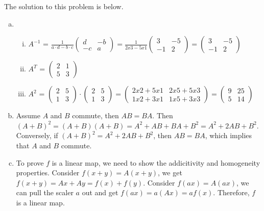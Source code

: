 \documentclass[10pt]{article}
\begin{document}
\begin{solution} 
The solution to this problem is below.
\begin{enumerate}[(a)]
    \item 
    \begin{enumerate}[(i)]
        \item $A^{-1}$ = $\frac{1}{a\cdot d-b\cdot c}\begin{pmatrix}d & -b \\ -c & a\end{pmatrix} = \frac{1}{2x3-5x1}\begin{pmatrix}3 & -5 \\ -1 & 2\end{pmatrix} = \begin{pmatrix}3 & -5 \\ -1 & 2\end{pmatrix}$
        \item $A^T$ = $\begin{pmatrix}2 & 1 \\ 5 & 3\end{pmatrix}$
        \item $A^2$ = $\begin{pmatrix}2 & 5 \\ 1 & 3\end{pmatrix} \cdot \begin{pmatrix}2 & 5 \\ 1 & 3\end{pmatrix} = \begin{pmatrix}2x2+5x1 & 2x5+5x3 \\ 1x2+3x1 & 1x5+3x3\end{pmatrix} = \begin{pmatrix}9 & 25 \\ 5 & 14\end{pmatrix}$
    \end{enumerate}
    \item Assume $A$ and $B$ commute, then $AB = BA$. Then $(A+B)^2 = (A+B)(A+B) = A^2 + AB + BA + B^2 = A^2 + 2AB + B^2$. Conversely, if $(A+B)^2 = A^2 + 2AB + B^2$, then $AB = BA$, which implies that $A$ and $B$ commute. 
    \item To prove $f$ is a linear map, we need to show the addicitivity and homogeneity properties. Consider $f(x+y) = A(x+y)$, we get $f(x+y) = Ax + Ay = f(x) + f(y)$. Consider $f(ax) = A(ax)$, we can pull the scaler $a$ out and get $f(ax) = a(Ax) = af(x)$. Therefore, $f$ is a linear map.
\end{enumerate}
\end{solution}
\end{document}
